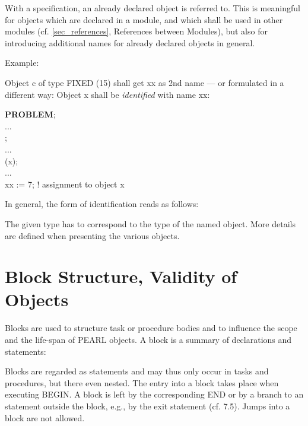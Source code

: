 With a specification, an already declared object is
referred to.  This is meaningful for objects which are declared in a
module, and which shall be used in other modules (cf. \ref{sec_references},
 References
between Modules), but also for introducing additional names for already
declared objects in general.
\newpage

Example:

Object c of type FIXED (15) shall get xx as 2nd name --- or formulated
in a different way: Object x shall be {\it identified} with name xx:

{\bf PROBLEM};\\
\x ...\\
;\\
\x ...\\
 (x);\\
\x ...\\
\x xx := 7; \x ! assignment to object x

In general, the form of identification reads as follows:






The given type has to correspond to the type of the named object. More
details are defined when presenting the various objects.

\section{Block Structure, Validity of Objects}   %
\label{sec_block}

Blocks are used to structure task or procedure bodies and to influence
the scope and the life-span of PEARL objects. A block is a summary of
declarations and statements:



Blocks are regarded as statements and may thus only occur in tasks and
procedures, but there even nested. The entry into a block takes
place when executing BEGIN. A block is left by the corresponding END or
by a branch to an statement outside the block, e.g., by the exit
statement (cf. 7.5). Jumps into a block are not allowed.

